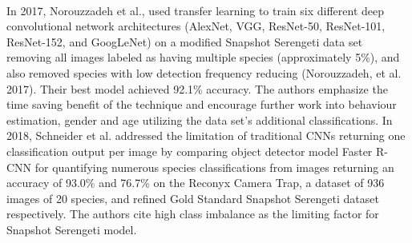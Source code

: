\documentclass[11pt]{article}
\begin{document}
\\
In 2017, Norouzzadeh et al., used transfer learning to train six different deep convolutional network architectures (AlexNet, VGG, ResNet-50, ResNet-101, ResNet-152, and GoogLeNet) on a modified Snapshot Serengeti data set removing all images labeled as having multiple species (approximately 5\%), and also removed species with low detection frequency reducing (Norouzzadeh, et al. 2017). Their best model achieved 92.1\% accuracy. The authors emphasize the time saving benefit of the technique and encourage further work into behaviour estimation, gender and age utilizing the data set's additional classifications. In 2018, Schneider et al. addressed the limitation of traditional CNNs returning one classification output per image by comparing object detector model Faster R-CNN for quantifying numerous species classifications from images returning an accuracy of 93.0\% and 76.7\% on the Reconyx Camera Trap, a dataset of 936 images of 20 species, and refined Gold Standard Snapshot Serengeti dataset respectively. The authors cite high class imbalance as the limiting factor for Snapshot Serengeti model.
\end{document}
